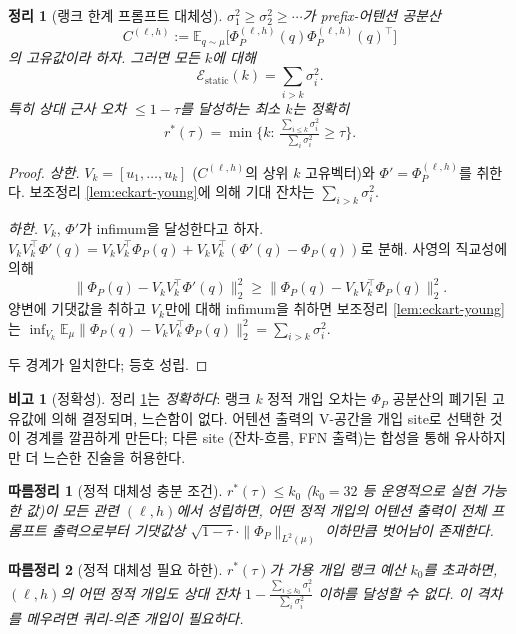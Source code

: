 \documentclass{article}
\newtheorem{theorem}{정리}
\newtheorem{corollary}{따름정리}
\theoremstyle{definition}
\newtheorem{remark}{비고}
\newcommand{\E}{\mathbb{E}}
\newcommand{\Phip}{\Phi_P}
\begin{document}
\begin{theorem}[랭크 한계 프롬프트 대체성]
\label{thm:rank-bounded}
$\sigma_1^2\ge \sigma_2^2\ge \cdots$가 prefix-어텐션 공분산
\[
C^{(\ell,h)} := \E_{q\sim\mu}\bigl[\Phip^{(\ell,h)}(q)\Phip^{(\ell,h)}(q)^\top\bigr]
\]
의 고유값이라 하자. 그러면 모든 $k$에 대해
\begin{equation}
\mathcal{E}_{\mathrm{static}}(k) = \sum_{i > k} \sigma_i^2.
\end{equation}
특히 상대 근사 오차 $\le 1-\tau$를 달성하는 최소 $k$는 정확히
\[
r^*(\tau) = \min\bigl\{k:\, \tfrac{\sum_{i\le k}\sigma_i^2}{\sum_i \sigma_i^2}\ge \tau\bigr\}.
\]
\end{theorem}

\begin{proof}
\emph{상한.} $V_k = [u_1,\dots,u_k]$ ($C^{(\ell,h)}$의 상위 $k$ 고유벡터)와 $\Phi' = \Phip^{(\ell,h)}$를 취한다. 보조정리 \ref{lem:eckart-young}에 의해 기대 잔차는 $\sum_{i>k}\sigma_i^2$.

\emph{하한.} $V_k$, $\Phi'$가 infimum을 달성한다고 하자. $V_kV_k^\top \Phi'(q) = V_kV_k^\top \Phip(q) + V_kV_k^\top(\Phi'(q)-\Phip(q))$로 분해. 사영의 직교성에 의해
\[
\|\Phip(q) - V_kV_k^\top\Phi'(q)\|_2^2 \ge \|\Phip(q) - V_kV_k^\top \Phip(q)\|_2^2.
\]
양변에 기댓값을 취하고 $V_k$만에 대해 infimum을 취하면 보조정리 \ref{lem:eckart-young}는 $\inf_{V_k}\E_\mu\|\Phip(q) - V_kV_k^\top\Phip(q)\|_2^2 = \sum_{i>k}\sigma_i^2$.

두 경계가 일치한다; 등호 성립.
\end{proof}

\begin{remark}[정확성]
정리 \ref{thm:rank-bounded}는 \emph{정확하다}: 랭크 $k$ 정적 개입 오차는 $\Phip$ 공분산의 폐기된 고유값에 의해 결정되며, 느슨함이 없다. 어텐션 출력의 V-공간을 개입 site로 선택한 것이 경계를 깔끔하게 만든다; 다른 site (잔차-흐름, FFN 출력)는 합성을 통해 유사하지만 더 느슨한 진술을 허용한다.
\end{remark}

\begin{corollary}[정적 대체성 충분 조건]
\label{cor:static-suff}
$r^*(\tau) \le k_0$ ($k_0 = 32$ 등 운영적으로 실현 가능한 값)이 모든 관련 $(\ell,h)$에서 성립하면, 어떤 정적 개입의 어텐션 출력이 전체 프롬프트 출력으로부터 기댓값상 $\sqrt{1-\tau}\cdot\|\Phip\|_{L^2(\mu)}$ 이하만큼 벗어남이 존재한다.
\end{corollary}

\begin{corollary}[정적 대체성 필요 하한]
\label{cor:static-nec}
$r^*(\tau)$가 가용 개입 랭크 예산 $k_0$를 초과하면, $(\ell,h)$의 어떤 정적 개입도 상대 잔차 $1 - \tfrac{\sum_{i\le k_0}\sigma_i^2}{\sum_i \sigma_i^2}$ 이하를 달성할 수 없다. 이 격차를 메우려면 \emph{쿼리-의존} 개입이 필요하다.
\end{corollary}
\end{document}
